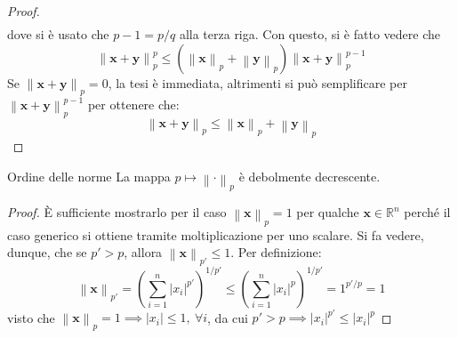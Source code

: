 \documentclass[11pt, a4paper]{scrartcl}
\theoremstyle{definition}
\numberwithin{esempio}{section}
\theoremstyle{definition}
\numberwithin{obs}{section}
\numberwithin{nota}{section}
\numberwithin{equation}{subsection}
\begin{document}
\begin{prop}
\begin{proof}
\[\begin{split}
		\end{split}
		\] 
		dove si \`e usato che $p-1 = p / q$ alla terza riga.
		Con questo, si \`e fatto vedere che
		\[
		\left\lVert \mathbf{x} +\mathbf{y}  \right\rVert _p^p \le \left(\left\lVert \mathbf{x}  \right\rVert _p + \left\lVert \mathbf{y}  \right\rVert _p\right) \left\lVert \mathbf{x} +\mathbf{y}  \right\rVert _p^{p-1} 
		\] 
		Se $\left\lVert \mathbf{x} +\mathbf{y}  \right\rVert _p = 0$, la tesi \`e immediata, altrimenti si pu\`o semplificare per $\left\lVert \mathbf{x} +\mathbf{y}  \right\rVert _p^{p-1} $ per ottenere che:
		\[
		\left\lVert \mathbf{x} +\mathbf{y}  \right\rVert _p \le \left\lVert \mathbf{x}  \right\rVert _p + \left\lVert \mathbf{y}  \right\rVert _p
		\] 
		
	\end{proof}
\end{prop}
\begin{prop}
	{Ordine delle norme}{}
	La mappa $p\mapsto \left\lVert \cdot  \right\rVert _p$ \`e debolmente decrescente.
	\begin{proof}
		\`E sufficiente mostrarlo per il caso $\left\lVert \mathbf{x}  \right\rVert _p = 1$ per qualche $\mathbf{x} \in \mathbb{R}^n$ perch\'e il caso generico si ottiene tramite moltiplicazione per uno scalare.
		Si fa vedere, dunque, che se $p' > p$, allora $\left\lVert \mathbf{x}  \right\rVert _{p'} \le 1$.
		Per definizione:
		\[
		\left\lVert \mathbf{x}  \right\rVert _{p'} = \left(\sum_{i=1}^{n} \lvert x_i \rvert ^{p'} \right) ^{1 / p'} \le \left(\sum_{i=1}^{n} \lvert x_i \rvert ^p\right) ^{1 / p'} = 1^{p' / p}  = 1
		\] 
		visto che $\left\lVert \mathbf{x}  \right\rVert _p = 1 \implies \lvert x_i \rvert \le 1, \ \forall i$, da cui $p' > p \implies \lvert x_i \rvert ^{p'} \le \lvert x_i \rvert ^p$
	\end{proof}
\end{prop}
\end{document}
